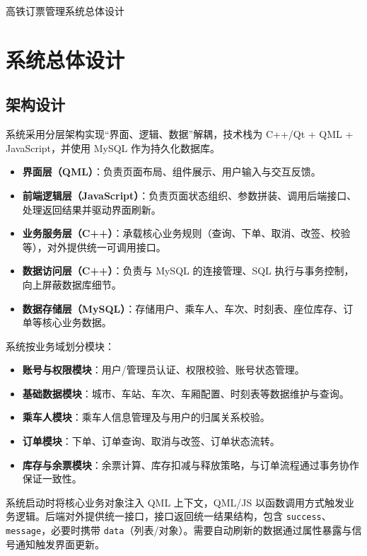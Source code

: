 \documentclass{article}
\begin{document}
	\begin{center}
		{\LARGE 高铁订票管理系统总体设计}
	\end{center}
	
	\vspace{1cm}
	
	\tableofcontents
	\newpage
	
	\section{系统总体设计}
	
	\subsection{架构设计}
	系统采用分层架构实现“界面、逻辑、数据”解耦，技术栈为 C++/Qt + QML + JavaScript，并使用 MySQL 作为持久化数据库。
	
	\begin{itemize}
		\item \textbf{界面层（QML）}：负责页面布局、组件展示、用户输入与交互反馈。
		\item \textbf{前端逻辑层（JavaScript）}：负责页面状态组织、参数拼装、调用后端接口、处理返回结果并驱动界面刷新。
		\item \textbf{业务服务层（C++）}：承载核心业务规则（查询、下单、取消、改签、校验等），对外提供统一可调用接口。
		\item \textbf{数据访问层（C++）}：负责与 MySQL 的连接管理、SQL 执行与事务控制，向上屏蔽数据库细节。
		\item \textbf{数据存储层（MySQL）}：存储用户、乘车人、车次、时刻表、座位库存、订单等核心业务数据。
	\end{itemize}
	
	系统按业务域划分模块：
	\begin{itemize}
		\item \textbf{账号与权限模块}：用户/管理员认证、权限校验、账号状态管理。
		\item \textbf{基础数据模块}：城市、车站、车次、车厢配置、时刻表等数据维护与查询。
		\item \textbf{乘车人模块}：乘车人信息管理及与用户的归属关系校验。
		\item \textbf{订单模块}：下单、订单查询、取消与改签、订单状态流转。
		\item \textbf{库存与余票模块}：余票计算、库存扣减与释放策略，与订单流程通过事务协作保证一致性。
	\end{itemize}
	
	系统启动时将核心业务对象注入 QML 上下文，QML/JS 以函数调用方式触发业务逻辑。后端对外提供统一接口，接口返回统一结果结构，包含 \texttt{success}、\texttt{message}，必要时携带 \texttt{data}（列表/对象）。需要自动刷新的数据通过属性暴露与信号通知触发界面更新。
	
\end{document}

